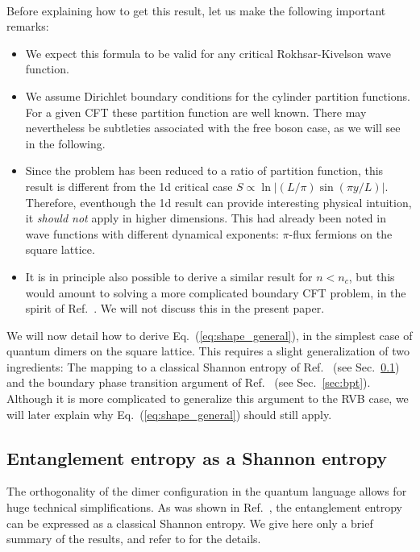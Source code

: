 \documentclass[11pt]{iopart}
\begin{document}
\paragraph{}Before explaining how to get this result, let us make the following important remarks:
\begin{itemize}
 \item We expect this formula to be valid for any critical Rokhsar-Kivelson wave function. 
 \item We assume Dirichlet boundary conditions for the cylinder partition functions. For a given CFT these partition function are well known\cite{BigYellowBook}. There may nevertheless be subtleties associated with the free boson case, as we will see in the following. 
 \item Since the problem has been reduced to a ratio of partition function, this result is different from the 1d critical case\cite{Cardy} $S\propto \ln \left|(L/\pi)\sin (\pi y/L)\right|$. Therefore, eventhough the 1d result can provide interesting physical intuition, it \emph{should not} apply in higher dimensions. This had already been noted in \cite{Ju2012} wave functions with different dynamical exponents: $\pi$-flux fermions on the square lattice.  
 \item It is in principle also possible to derive a similar result for $n<n_c$, but this would amount to solving a more complicated boundary CFT problem, in the spirit of Ref.~\cite{Oshikawa}. We will not discuss this in the present paper. 
\end{itemize}
We will now detail how to derive Eq.~(\ref{eq:shape_general}), in the simplest case of quantum dimers on the square lattice. This requires a slight generalization of two ingredients: The mapping to a classical Shannon entropy of Ref.~\cite{Shannonee} (see Sec.~\ref{sec:eeshannon}) and the boundary phase transition argument of Ref.~\cite{Stephan2011} (see Sec.~\ref{sec:bpt}). Although it is more complicated to generalize this argument to the RVB case, we will later explain why  Eq.~(\ref{eq:shape_general}) should still apply.
\subsection{Entanglement entropy as a Shannon entropy}
\label{sec:eeshannon}
The orthogonality of the dimer configuration in the quantum language allows for huge technical simplifications. As was shown in Ref.~\cite{Shannonee}, the entanglement entropy can be expressed as a classical Shannon entropy. We give here only a brief summary of the results, and refer to \cite{Shannonee} for the details.
\end{document}
